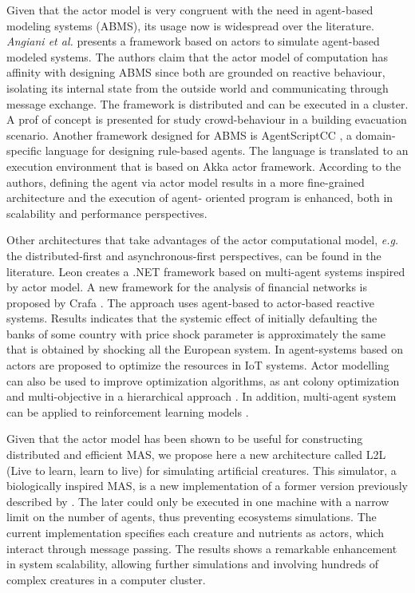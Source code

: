 \documentclass[runningheads]{llncs}
\begin{document}
Given that the actor model is very congruent with the need in agent-based modeling systems (ABMS), its usage now is widespread over the literature.
\textit{Angiani et al.} \cite{angiani2018} presents a framework based on actors to simulate agent-based modeled systems. The authors claim that the actor model of computation has affinity with designing ABMS since both are grounded on reactive behaviour, isolating its internal state from the outside world and communicating through message exchange. The framework is distributed and can be executed in a cluster. A prof of concept is presented for study crowd-behaviour in a building evacuation scenario.
Another framework designed for ABMS is AgentScriptCC \cite{mohajeri2020}, a domain-specific language for designing rule-based agents. The language is translated to an execution environment that is based on Akka actor framework. According to the authors, defining the agent via actor
model results in a more fine-grained architecture and the execution of agent-
oriented program is enhanced, both in scalability and performance perspectives. 

Other architectures that take advantages of the actor computational model, \textit{e.g.} the distributed-first and asynchronous-first perspectives, can be found in the literature.
Leon \cite{math10030382} creates a .NET framework based on multi-agent systems inspired
by actor model. A new framework for the analysis of financial networks is
proposed by Crafa \cite{Crafa}. The approach uses agent-based to actor-based reactive
systems. Results indicates that the systemic effect of initially defaulting the
banks of some country with price shock parameter is approximately the same
that is obtained by shocking all the European system. In \cite{NGUYEN2021103143} agent-systems
based on actors are proposed to optimize the resources in IoT systems. Actor
modelling can also be used to improve optimization algorithms, as ant colony
optimization \cite{STARZEC2019102573} and multi-objective in a hierarchical approach \cite{idzik}.  In addition,
multi-agent system can be applied to reinforcement learning models \cite{9113746,LI2022117900}.

Given that the actor model has been shown to be useful for constructing distributed and efficient MAS, we propose here a new architecture called L2L (Live to learn, learn to live) for simulating artificial creatures. This simulator, a biologically inspired MAS, is a new implementation of a former version previously described by \cite{Campos}. The later could only be executed in one machine with a narrow limit on the number of agents, thus preventing ecosystems simulations. The current implementation specifies each creature and nutrients as actors, which interact through message passing. The results shows a remarkable enhancement in system scalability, allowing further simulations and involving hundreds of complex creatures in a computer cluster. 
\end{document}
